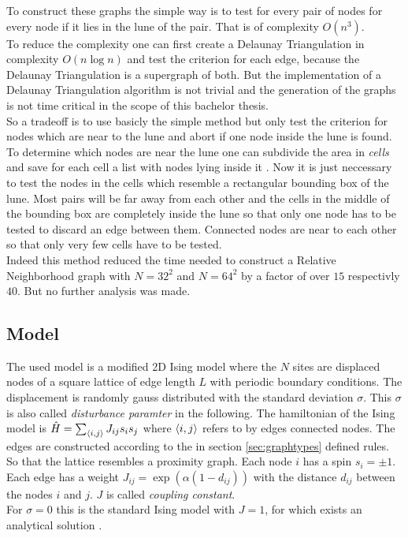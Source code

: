     To construct these graphs the simple way is to test for every
    pair of nodes for every node if it lies in the lune of the pair.
    That is of complexity \(O (n^3)\).\\
    To reduce the complexity one can first create a Delaunay
    Triangulation in complexity \(O (n \log n)\)
    \cite{Leach1992} and test the criterion for each edge, because
    the Delaunay Triangulation is a supergraph of both. But the
    implementation of a Delaunay Triangulation algorithm is not
    trivial and the generation of the graphs is not time critical in
    the scope of this bachelor thesis.\\
    So a tradeoff is to use basicly the simple method but only test
    the criterion for nodes which are near to the lune and abort if
    one node inside the lune is found. To determine which nodes are
    near the lune one can subdivide the area in \emph{cells} and save
    for each cell a list with nodes lying inside it \cite{RNGCell}.
    Now it is just neccessary to test the nodes in the cells which
    resemble a rectangular bounding box of the lune. Most pairs will be
    far away from each other and the cells in the middle of the bounding
    box are completely inside the lune so that only one node has to be
    tested to discard an edge between them. Connected nodes are near to
    each other so that only very few cells have to be tested.\\
    Indeed this method reduced the time needed to construct a Relative
    Neighborhood graph with \(N=32^2\) and \(N=64^2\) by a factor of
    over \(15\) respectivly \(40\). But no further analysis was made.

\subsection{Model}
\label{ssec:isingmodel}
    The used model is a modified 2D Ising model where the \(N\) sites
    are displaced nodes of a square lattice of edge length \(L\) with
    periodic boundary conditions. The displacement is randomly gauss
    distributed with the standard deviation \(\sigma\). This \(\sigma\)
    is also called \emph{disturbance paramter} in the following.
    The hamiltonian of the Ising model is
    \(\hat{H} = \sum_{\left< i,j \right>}J_{ij}s_{i}s_{j}\)
    where \(\left< i,j \right>\) refers to by edges connected nodes.
    The edges are constructed according to the in section
    \ref{sec:graphtypes} defined rules. So that the lattice resembles a
    proximity graph. Each node \(i\) has a spin \(s_i = \pm 1\). Each
    edge has a weight \(J_{ij} = \exp (\alpha (1-d_{ij}))\) with the
    distance \(d_{ij}\) between the nodes \(i\) and \(j\). \(J\) is
    called \emph{coupling constant}.\\
    For \(\sigma = 0\) this is the standard Ising model with \(J = 1\),
    for which exists an analytical solution \cite{Onsager1944}.\\

